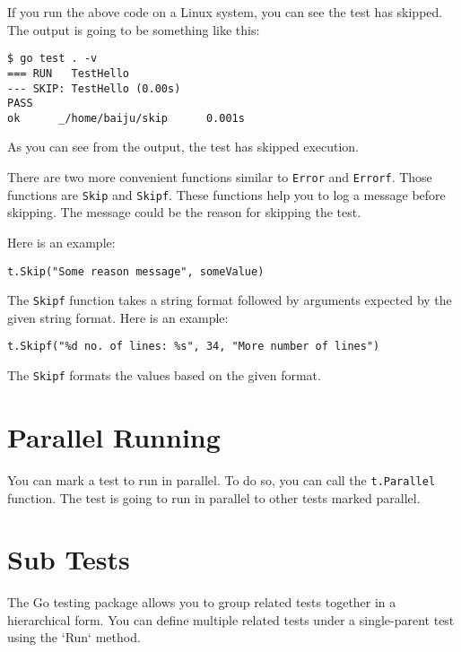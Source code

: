 

If you run the above code on a Linux system, you can see the test has
skipped.  The output is going to be something like this:

\begin{lstlisting}[numbers=none]
$ go test . -v
=== RUN   TestHello
--- SKIP: TestHello (0.00s)
PASS
ok      _/home/baiju/skip      0.001s
\end{lstlisting}

As you can see from the output, the test has skipped execution.

There are two more convenient functions similar to \texttt{Error}
and \texttt{Errorf}.  Those functions are \texttt{Skip}
and \texttt{Skipf}.  These functions help you to log a message before
skipping.  The message could be the reason for skipping the test.

Here is an example:

\begin{lstlisting}[numbers=none]
t.Skip("Some reason message", someValue)
\end{lstlisting}

The \texttt{Skipf} function takes a string format followed by
arguments expected by the given string format.  Here is an example:

\begin{lstlisting}[numbers=none]
t.Skipf("%d no. of lines: %s", 34, "More number of lines")
\end{lstlisting}

The \texttt{Skipf} formats the values based on the given format.

\section{Parallel Running}

You can mark a test to run in parallel. To do so, you can call the
\texttt{t.Parallel} function.  The test is going to run in parallel to other
tests marked parallel.

\section{Sub Tests}

The Go testing package allows you to group related tests together in a
hierarchical form. You can define multiple related tests under a single-parent
test using the `Run` method.

